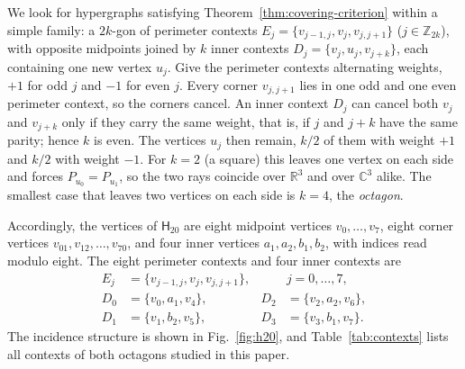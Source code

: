 \documentclass[twocolumn,aps,pra,floatfix,amsmath,amssymb,longbibliography]{revtex4-2}
\newenvironment{handrewrite}{\leavevmode\color{blue}}{}
\theoremstyle{definition}
\theoremstyle{remark}
\newcommand{\C}{\mathbb C}
\newcommand{\R}{\mathbb R}
\newcommand{\Htwenty}{\mathsf H_{20}}
\begin{document}
\begin{handrewrite}
We look for hypergraphs satisfying Theorem~\ref{thm:covering-criterion}
within a simple family: a $2k$-gon of perimeter contexts
$E_j=\{v_{j-1,j},v_j,v_{j,j+1}\}$ ($j\in\mathbb Z_{2k}$), with opposite
midpoints joined by $k$ inner contexts $D_j=\{v_j,u_j,v_{j+k}\}$, each
containing one new vertex $u_j$.  Give the perimeter contexts alternating
weights, $+1$ for odd $j$ and $-1$ for even $j$.  Every corner
$v_{j,j+1}$ lies in one odd and one even perimeter context, so the corners
cancel.  An inner context $D_j$ can cancel both $v_j$ and $v_{j+k}$ only if
they carry the same weight, that is, if $j$ and $j+k$ have the same parity;
hence $k$ is even.  The vertices $u_j$ then remain, $k/2$ of them with
weight $+1$ and $k/2$ with weight $-1$.  For $k=2$ (a square) this leaves
one vertex on each side and forces $P_{u_0}=P_{u_1}$, so the two rays
coincide over $\R^3$ and over $\C^3$ alike.  The smallest case that leaves two
vertices on each side is $k=4$, the \emph{octagon}.
\end{handrewrite}

Accordingly, the vertices of $\Htwenty$ are eight midpoint vertices
$v_0,\ldots,v_7$, eight corner vertices
$v_{01},v_{12},\ldots,v_{70}$, and four inner vertices
$a_1,a_2,b_1,b_2$, with indices read modulo eight.  The eight perimeter
contexts and four inner contexts are
\begin{align}
 E_j&=\{v_{j-1,j},v_j,v_{j,j+1}\}, &&j=0,\ldots,7,
 \label{eq:perimeter-contexts}\\
 D_0&=\{v_0,a_1,v_4\},&D_2&=\{v_2,a_2,v_6\},\nonumber\\
 D_1&=\{v_1,b_2,v_5\},&D_3&=\{v_3,b_1,v_7\}.
 \label{eq:inner-contexts}
\end{align}
The incidence structure is shown in Fig.~\ref{fig:h20}, and
Table~\ref{tab:contexts} lists all contexts of both octagons studied in this
paper.
\end{document}
